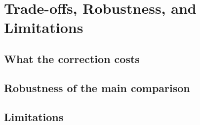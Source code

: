 \section{Trade-offs, Robustness, and Limitations}\label{sec:tradeoffs}
\subsection{What the correction costs}\label{sec:costs}
\subsection{Robustness of the main comparison}\label{sec:robustness}
\subsection{Limitations}\label{sec:limitations}
